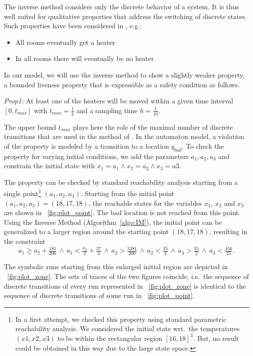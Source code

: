 \documentclass{llncs}
\begin{document}
\begin{example}
  The inverse method considers only the discrete behavior of a
  system. It is thus well suited for qualitative properties that
  address the switching of discrete states.  Such properties have been
  considered in \cite{FI:2004}, e.g.:
  \begin{itemize}
  \item All rooms eventually get a heater
  \item In all rooms there will eventually be no heater
  \end{itemize}
  In our model, we will use the inverse method to show a slightly
  weaker property, a bounded liveness property that is expressible as
  a safety condition as follows.  
  \begin{description}
  \item{\textit{Prop1:}} At least one of the heaters will be moved within a
    given time interval $[0, t_{max}]$ with $t_{max} = \frac{1}{2}$
    and a sampling time $h=\frac{1}{10}$.
  \end{description}
  The upper bound $t_{max}$ plays here the role of the maximal number
  of discrete transitions that are used in the method of
  \cite{AKRS:2008}. In the automaton model, a violation of the
  property is modeled by a transition to a location $q_{bad}$. To
  check the property for varying initial conditions, we add the
  parameters $a_1, a_2, a_3$ and constrain the initial state with
  $x_1=a_1 \wedge x_2=a_2 \wedge x_3=a3$.
  
  The property can be checked by standard reachability analysis
  starting from a single point\footnote{In a first attempt, we checked
    this property using standard parametric reachability analysis. We
    considered the initial state wrt.~the temperatures $(x1,x2,x3)$ to
    be within the rectangular region $[16,18]^3$. But, no result could
    be obtained in this way due to the large state space.} $(a_1, a_2,
  a_3)$.  Starting from the initial point $(a_1, a_2,
  a_3)=(18,17,18)$, the reachable states for the variables $x_1$,
  $x_2$ and $x_3$ are shown in \figurename~\ref{fig:plot_point}. The
  bad location is not reached from this point. Using the Inverse
  Method (Algorithm~\ref{algo:IM}), the initial point can be
  generalized to a larger region around the starting point $(18, 17,
  18)$, resulting in the constraint
  \begin{equation*}
    a_1 \geq a_2 + \tfrac{181}{200} \, \wedge \, a_1 < \tfrac{a_3}{2} + \tfrac{37}{4} \, \wedge \, a_2 > \tfrac{3381}{200} \, \wedge 
    \, a_2 < \tfrac{35}{2} \, \wedge \,  a_3 > \tfrac{35}{2} \, \wedge \, a_3 < \tfrac{456}{25}.
  \end{equation*}

  The symbolic runs starting from this enlarged initial region are
  depicted in \figurename~\ref{fig:plot_zone}.  The sets of traces of the
  two figures coincide, i.e.~the sequence of discrete transitions of
  every run represented in \figurename~\ref{fig:plot_zone} is identical
  to the sequence of discrete transitions of some run in
  \figurename~\ref{fig:plot_point}. 
\end{example}
\end{document}
